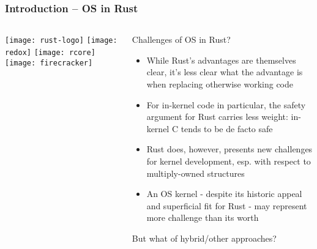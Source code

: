 \begin{frame}[plain]
	\frametitle{Introduction -- OS in Rust}
	
	
	
	\begin{columns}
		
		\begin{column}{.2\textwidth}
			
			\texttt{[image: rust-logo]}
			\texttt{[image: redox]}
			\texttt{[image: rcore]}
			\texttt{[image: firecracker]}
		\end{column}
		
		\begin{column}{.8\textwidth}
			
			Challenges of OS in Rust? 
			
			\begin{itemize}
				
				\item While Rust’s advantages are themselves clear, it’s less clear
				what the advantage is when replacing otherwise working code
				
				\item   For in-kernel code in particular, the safety argument for Rust carries less weight: in-kernel C tends to be de facto safe

				\item Rust does, however, presents new challenges for kernel
				development, esp. with respect to multiply-owned structures

				\item An OS kernel - despite its historic appeal and superficial fit for	Rust - may represent more challenge than its worth
				
				
			\end{itemize}
			But what of hybrid/other approaches?
			
		\end{column}
		
		
	\end{columns}
	
	
\end{frame}





